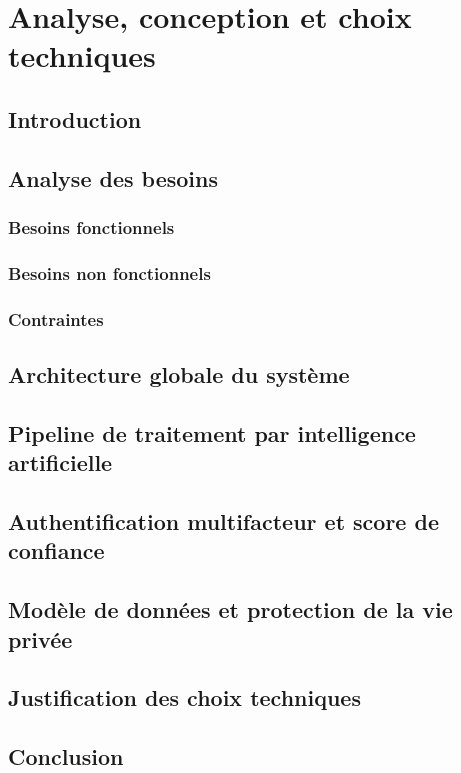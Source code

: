 \chapter{Analyse, conception et choix techniques}

\section*{Introduction}
\aredigerr

\section{Analyse des besoins}
\subsection{Besoins fonctionnels}\aredigerr
\subsection{Besoins non fonctionnels}\aredigerr
\subsection{Contraintes}\aredigerr

\section{Architecture globale du système}
\aredigerr

\section{Pipeline de traitement par intelligence artificielle}
\aredigerr

\section{Authentification multifacteur et score de confiance}
\aredigerr

\section{Modèle de données et protection de la vie privée}
\aredigerr

\section{Justification des choix techniques}
\aredigerr

\section*{Conclusion}
\aredigerr
